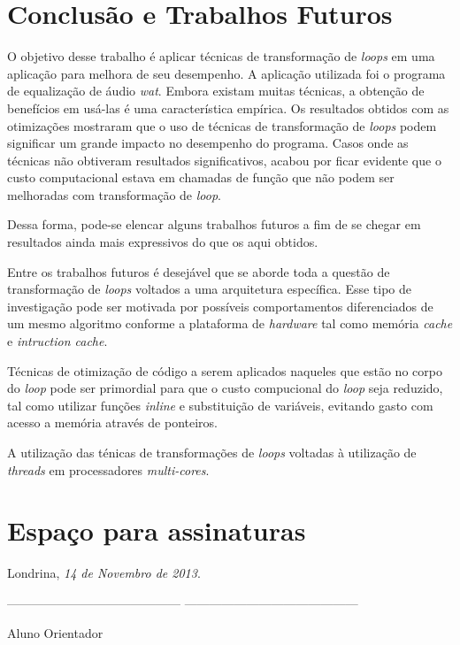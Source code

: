 \documentclass[12pt]{article}
\begin{document}
\section{Conclusão e Trabalhos Futuros}

O objetivo desse trabalho é aplicar técnicas de transformação de \textit{loops} 
em uma aplicação para melhora de seu desempenho. 
A aplicação utilizada foi o programa de equalização de áudio \textit{wat}. 
Embora existam muitas técnicas, a obtenção de benefícios em usá-las é uma 
característica empírica. 
Os resultados obtidos com as otimizações mostraram que o uso de técnicas de
transformação de \textit{loops} podem significar um grande impacto no desempenho
do programa.
Casos onde as técnicas não obtiveram resultados significativos, acabou por ficar
evidente que o custo computacional estava em chamadas de função que não podem
ser melhoradas com transformação de \textit{loop}.

Dessa forma, pode-se elencar alguns trabalhos futuros a fim de se chegar em 
resultados ainda mais expressivos do que os aqui obtidos. 

Entre os trabalhos futuros é desejável que se aborde toda a questão de 
transformação de \textit{loops} voltados a uma arquitetura específica. 
Esse tipo de investigação pode ser motivada por possíveis comportamentos 
diferenciados de um mesmo algoritmo conforme a plataforma de 
\textit{hardware} tal como memória \textit{cache} e \textit{intruction cache}.

Técnicas de otimização de código a serem aplicados naqueles que estão no
corpo do \textit{loop} pode ser primordial para que o custo compucional do
\textit{loop} seja reduzido, tal como utilizar funções \textit{inline} e
substituição de variáveis, evitando gasto com acesso a memória através de
ponteiros.

A utilização das ténicas de transformações de \textit{loops} voltadas à
utilização de \textit{threads} em processadores \textit{multi-cores}.




\section {Espaço para assinaturas}


\vspace{1cm}

\hfill Londrina, \textit{14 de Novembro de 2013}.


\vspace{1cm}
\noindent
------------------------------------------ \hfill ------------------------------------------

\hspace{1cm} Aluno \hspace{8cm} Orientador

\end{document}
